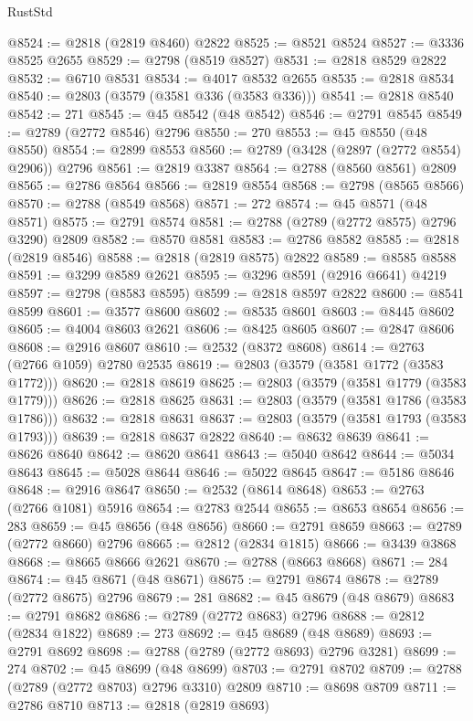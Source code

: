 \begin{lexlean}{RustStd}
\begin{coremodule}
@8524 := @2818 (@2819 @8460) @2822
@8525 := @8521 @8524
@8527 := @3336 @8525 @2655
@8529 := @2798 (@8519 @8527)
@8531 := @2818 @8529 @2822
@8532 := @6710 @8531
@8534 := @4017 @8532 @2655
@8535 := @2818 @8534
@8540 := @2803 (@3579 (@3581 @336 (@3583 @336)))
@8541 := @2818 @8540
@8542 := 271
@8545 := @45 @8542 (@48 @8542)
@8546 := @2791 @8545
@8549 := @2789 (@2772 @8546) @2796
@8550 := 270
@8553 := @45 @8550 (@48 @8550)
@8554 := @2899 @8553
@8560 := @2789 (@3428 (@2897 (@2772 @8554) @2906)) @2796
@8561 := @2819 @3387
@8564 := @2788 (@8560 @8561) @2809
@8565 := @2786 @8564
@8566 := @2819 @8554
@8568 := @2798 (@8565 @8566)
@8570 := @2788 (@8549 @8568)
@8571 := 272
@8574 := @45 @8571 (@48 @8571)
@8575 := @2791 @8574
@8581 := @2788 (@2789 (@2772 @8575) @2796 @3290) @2809
@8582 := @8570 @8581
@8583 := @2786 @8582
@8585 := @2818 (@2819 @8546)
@8588 := @2818 (@2819 @8575) @2822
@8589 := @8585 @8588
@8591 := @3299 @8589 @2621
@8595 := @3296 @8591 (@2916 @6641) @4219
@8597 := @2798 (@8583 @8595)
@8599 := @2818 @8597 @2822
@8600 := @8541 @8599
@8601 := @3577 @8600
@8602 := @8535 @8601
@8603 := @8445 @8602
@8605 := @4004 @8603 @2621
@8606 := @8425 @8605
@8607 := @2847 @8606
@8608 := @2916 @8607
@8610 := @2532 (@8372 @8608)
@8614 := @2763 (@2766 @1059) @2780 @2535
@8619 := @2803 (@3579 (@3581 @1772 (@3583 @1772)))
@8620 := @2818 @8619
@8625 := @2803 (@3579 (@3581 @1779 (@3583 @1779)))
@8626 := @2818 @8625
@8631 := @2803 (@3579 (@3581 @1786 (@3583 @1786)))
@8632 := @2818 @8631
@8637 := @2803 (@3579 (@3581 @1793 (@3583 @1793)))
@8639 := @2818 @8637 @2822
@8640 := @8632 @8639
@8641 := @8626 @8640
@8642 := @8620 @8641
@8643 := @5040 @8642
@8644 := @5034 @8643
@8645 := @5028 @8644
@8646 := @5022 @8645
@8647 := @5186 @8646
@8648 := @2916 @8647
@8650 := @2532 (@8614 @8648)
@8653 := @2763 (@2766 @1081) @5916
@8654 := @2783 @2544
@8655 := @8653 @8654
@8656 := 283
@8659 := @45 @8656 (@48 @8656)
@8660 := @2791 @8659
@8663 := @2789 (@2772 @8660) @2796
@8665 := @2812 (@2834 @1815)
@8666 := @3439 @3868
@8668 := @8665 @8666 @2621
@8670 := @2788 (@8663 @8668)
@8671 := 284
@8674 := @45 @8671 (@48 @8671)
@8675 := @2791 @8674
@8678 := @2789 (@2772 @8675) @2796
@8679 := 281
@8682 := @45 @8679 (@48 @8679)
@8683 := @2791 @8682
@8686 := @2789 (@2772 @8683) @2796
@8688 := @2812 (@2834 @1822)
@8689 := 273
@8692 := @45 @8689 (@48 @8689)
@8693 := @2791 @8692
@8698 := @2788 (@2789 (@2772 @8693) @2796 @3281)
@8699 := 274
@8702 := @45 @8699 (@48 @8699)
@8703 := @2791 @8702
@8709 := @2788 (@2789 (@2772 @8703) @2796 @3310) @2809
@8710 := @8698 @8709
@8711 := @2786 @8710
@8713 := @2818 (@2819 @8693)

\end{coremodule}
\end{lexlean}
